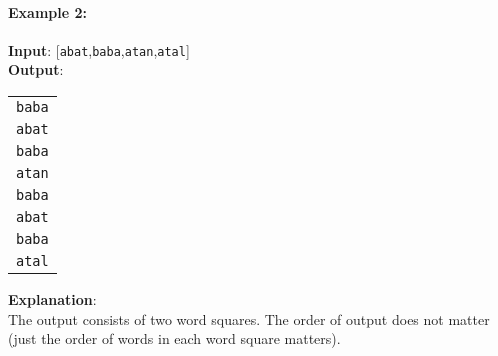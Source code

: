 \paragraph{Example 2:}

\begin{flushleft}
\textbf{Input}: [\texttt{abat},\texttt{baba},\texttt{atan},\texttt{atal}]
\\

\textbf{Output}:
\begin{table}[H]
\begin{tabular}{l}
\texttt{baba}\\
\texttt{abat}\\
\texttt{baba}\\
\texttt{atan}\\
\hline 
\hline
\texttt{baba}\\
\texttt{abat}\\
\texttt{baba}\\
\texttt{atal}
\end{tabular}
\end{table}
\textbf{Explanation}:
\\
The output consists of two word squares. The order of output does not matter (just the order of words in each word square matters).
\end{flushleft}


